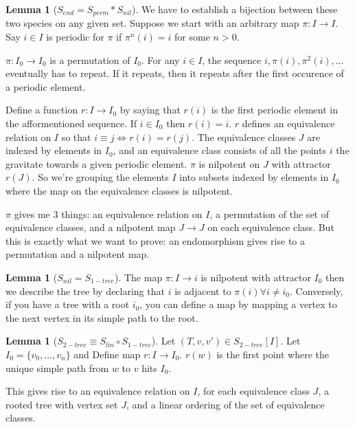 \documentclass[12pt]{article}
\theoremstyle{definition}
\newtheorem{lemma}[theorem]{Lemma}
\begin{document}
\begin{lemma}[$S_{end} = S_{perm} * S_{nil}$]
    We have to establish a bijection between these two species on any given
    set. Suppose we start with an arbitrary map $\pi: I \rightarrow I$.  Say $i
    \in I$ is periodic for $\pi$ if $\pi^n(i) = i$ for some $n > 0$. 

    $\pi: I_0 \rightarrow I_0$ is a permutation of $I_0$. For any $i \in I$,
    the sequence $i, \pi(i), \pi^2(i), \ldots$ eventually has to repeat. If it
    repeats, then it repeats after the first occurence of a periodic element.

    Define a function $r: I \rightarrow I_0$ by saying that $r(i)$ is the first
    periodic element in the afformentioned sequence. If $i \in I_0$ then $r(i)
    = i$. $r$ defines an equivalence relation on $I$ so that $i \equiv j
    \Leftrightarrow r(i) = r(j)$. The equivalence classes $J$ are indexed by
    elements in $I_0$, and an equivalence class consists of all the points $i$
    the gravitate towards a given periodic element. $\pi$ is nilpotent on $J$
    with attractor $r(J)$. So we're grouping the elements $I$ into subsets
    indexed by elements in $I_0$ where the map on the equivalence classes is
    nilpotent.

    $\pi$ gives me 3 things: an equivalence relation on $I$, a permutation of
    the set of equivalence classes, and a nilpotent map $J \rightarrow J$ on
    each equivalence class. But this is exactly what we want to prove: an
    endomorphism gives rise to a permutation and a nilpotent map.
\end{lemma}

\begin{lemma}[$S_{nil} = S_{1-tree}$]
    The map $\pi: I \rightarrow i$ is nilpotent with attractor $I_0$ then we
    describe the tree by declaring that $i$ is adjacent to $\pi(i) \forall i
    \ne i_0$. Conversely, if you have a tree with a root $i_0$, you can define
    a map by mapping a vertex to the next vertex in its simple path to the
    root.
\end{lemma}

\begin{lemma}[$S_{2-tree} \equiv S_{lin} \circ S_{1-tree}$]
    Let $(T, v, v') \in S_{2-tree}[I]$. Let $I_0 = \{v_0, \ldots, v_n\}$ and
    Define map $r: I \rightarrow I_0$. $r(w)$ is the first point where the unique
    simple path from $w$ to $v$ hits $I_0$.

    This gives rise to an equivalence relation on $I$, for each equivalence
    class $J$, a rooted tree with vertex set $J$, and a linear ordering of the
    set of equivalence classes.
\end{lemma}
\end{document}
